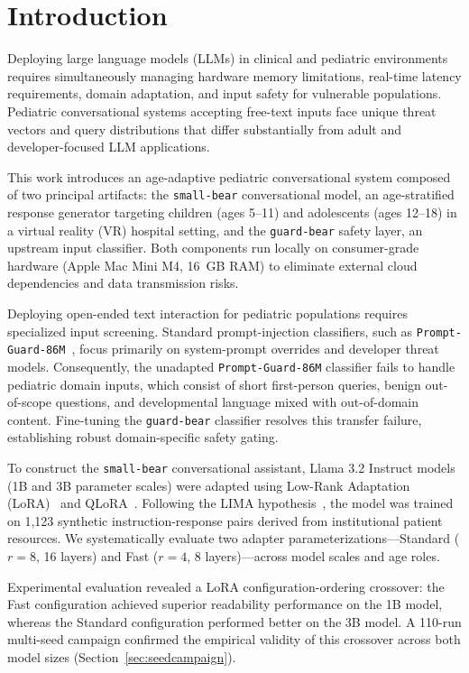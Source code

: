 \documentclass[pdflatex,sn-mathphys-num]{sn-jnl-official}%
\begin{document}
\section{Introduction}\label{sec1}

Deploying large language models (LLMs) in clinical and pediatric environments requires simultaneously managing hardware memory limitations, real-time latency requirements, domain adaptation, and input safety for vulnerable populations. Pediatric conversational systems accepting free-text inputs face unique threat vectors and query distributions that differ substantially from adult and developer-focused LLM applications.

This work introduces an age-adaptive pediatric conversational system composed of two principal artifacts: the \texttt{small-bear} conversational model, an age-stratified response generator targeting children (ages 5--11) and adolescents (ages 12--18) in a virtual reality (VR) hospital setting, and the \texttt{guard-bear} safety layer, an upstream input classifier. Both components run locally on consumer-grade hardware (Apple Mac Mini M4, 16~GB RAM) to eliminate external cloud dependencies and data transmission risks.

Deploying open-ended text interaction for pediatric populations requires specialized input screening. Standard prompt-injection classifiers, such as \texttt{Prompt-Guard-86M}~\cite{promptguard2024}, focus primarily on system-prompt overrides and developer threat models. Consequently, the unadapted \texttt{Prompt-Guard-86M} classifier fails to handle pediatric domain inputs, which consist of short first-person queries, benign out-of-scope questions, and developmental language mixed with out-of-domain content. Fine-tuning the \texttt{guard-bear} classifier resolves this transfer failure, establishing robust domain-specific safety gating.

To construct the \texttt{small-bear} conversational assistant, Llama 3.2 Instruct models~\cite{dubey2024llama3} (1B and 3B parameter scales) were adapted using Low-Rank Adaptation (LoRA)~\cite{hu2022lora} and QLoRA~\cite{dettmers2023qlora}. Following the LIMA hypothesis~\cite{zhou2023lima}, the model was trained on 1,123 synthetic instruction-response pairs derived from institutional patient resources. We systematically evaluate two adapter parameterizations---Standard ($r=8$, 16 layers) and Fast ($r=4$, 8 layers)---across model scales and age roles.

Experimental evaluation revealed a LoRA configuration-ordering crossover: the Fast configuration achieved superior readability performance on the 1B model, whereas the Standard configuration performed better on the 3B model. A 110-run multi-seed campaign confirmed the empirical validity of this crossover across both model sizes (Section~\ref{sec:seedcampaign}).
\end{document}
